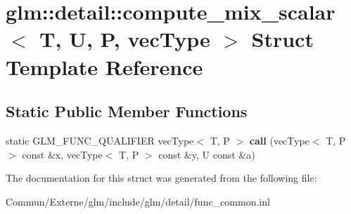 \hypertarget{structglm_1_1detail_1_1compute__mix__scalar}{}\section{glm\+:\+:detail\+:\+:compute\+\_\+mix\+\_\+scalar$<$ T, U, P, vec\+Type $>$ Struct Template Reference}
\label{structglm_1_1detail_1_1compute__mix__scalar}
\subsection*{Static Public Member Functions}
\begin{DoxyCompactItemize}
\item 
static G\+L\+M\+\_\+\+F\+U\+N\+C\+\_\+\+Q\+U\+A\+L\+I\+F\+I\+ER vec\+Type$<$ T, P $>$ {\bfseries call} (vec\+Type$<$ T, P $>$ const \&x, vec\+Type$<$ T, P $>$ const \&y, U const \&a)\hypertarget{structglm_1_1detail_1_1compute__mix__scalar_a15fb89e5dac67f6645419fd7eaebdc5f}{}\label{structglm_1_1detail_1_1compute__mix__scalar_a15fb89e5dac67f6645419fd7eaebdc5f}

\end{DoxyCompactItemize}


The documentation for this struct was generated from the following file\+:\begin{DoxyCompactItemize}
\item 
Commun/\+Externe/glm/include/glm/detail/func\+\_\+common.\+inl\end{DoxyCompactItemize}
